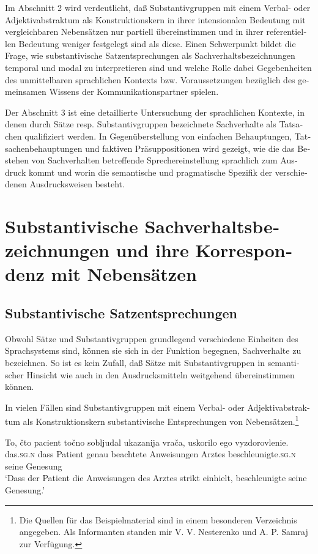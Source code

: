 \documentclass[output=paper]{langscibook}
\begin{document}
\begin{otherlanguage}{german}
Im Abschnitt 2 wird verdeutlicht, daß Substantivgruppen mit einem Verbal- oder Adjektivabstraktum als Konstruktionskern in ihrer intensionalen Bedeutung mit vergleichbaren Nebensätzen nur partiell übereinstimmen und in ihrer referentiellen Bedeutung weniger festgelegt sind als diese. Einen Schwerpunkt bildet die Frage, wie substantivische Satzentsprechungen als Sachverhaltsbezeichnungen temporal und modal zu interpretieren sind und welche Rolle dabei Ge\-ge\-ben\-hei\-ten des unmittelbaren sprachlichen Kontexts bzw. Voraussetzungen be\-züg\-lich des gemeinsamen Wissens der Kommunikationspartner spielen.

Der Abschnitt 3 ist eine detaillierte Untersuchung der sprachlichen Kontexte, in denen durch Sätze resp. Substantivgruppen bezeichnete Sachverhalte als Tatsachen qualifiziert werden. In Gegenüberstellung von einfachen Behauptungen, Tatsachenbehauptungen und faktiven Präsuppositionen wird gezeigt, wie die das Bestehen von Sachverhalten betreffende Sprechereinstellung sprachlich zum Ausdruck kommt und worin die semantische und pragmatische Spezifik der verschiedenen Ausdrucksweisen besteht.

\largerpage[2]
\section{Substantivische Sachverhaltsbezeichnungen und ihre Korrespondenz mit Nebensätzen} \label{sec:zi83:1}
\subsection{Substantivische Satzentsprechungen} \label{sec:zi83:1.1}

Obwohl Sätze und Substantivgruppen grundlegend verschiedene Einheiten des Sprachsystems sind, können sie sich in der Funktion begegnen, Sachverhalte zu bezeichnen. So ist es kein Zufall, daß Sätze mit Substantivgruppen in se\-man\-ti\-scher Hinsicht wie auch in den Ausdrucksmitteln weitgehend übereinstimmen können.

In vielen Fällen sind Substantivgruppen mit einem Verbal- oder Adjektiv\-ab\-strak\-tum als Konstruktionskern substantivische Entsprechungen von Ne\-ben\-sätzen.\footnote{Die Quellen für das Beispielmaterial sind in einem besonderen Verzeichnis angegeben. Als Informanten standen mir V. V. Nesterenko und A. P. Samraj zur Verfügung.}

\ea \label{ex:zi83:1}
    \ea \label{ex:zi83:1a}
    \gll To, čto pacient točno sobljudal ukazanija vrača, uskorilo ego vyzdorovlenie. \\
    das.\textsc{sg}.\textsc{n} dass Patient genau beachtete Anweisungen Arztes beschleunigte.\textsc{sg}.\textsc{n} seine Genesung \\
    \glt ‘Dass der Patient die Anweisungen des Arztes strikt einhielt, beschleunigte seine Genesung.’


\end{otherlanguage}
\end{document}

